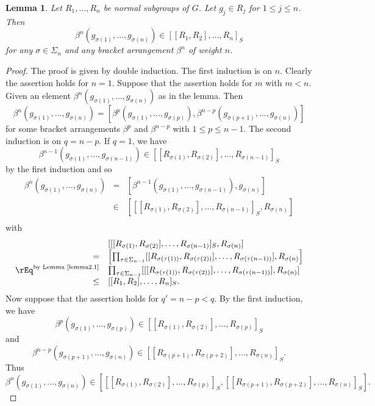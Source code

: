 \documentclass[10pt]{amsart}
\newtheorem{lem}[thm]{Lemma}
\numberwithin{equation}{section}
\begin{document}
\begin{lem}\label{lemma2.3}
Let $R_1,\ldots,R_n$ be normal subgroups of $G$. Let $g_j\in R_j$ for $1\leq j\leq n$. Then
$$
\beta^n(g_{\sigma(1)},\ldots,g_{\sigma(n)})\in [[R_1,R_2],\ldots,R_n]_S
$$
for any $\sigma\in \Sigma_n$ and any bracket arrangement $\beta^n$ of weight $n$.
\end{lem}
\begin{proof}
The proof is given by double induction. The first induction is on $n$. Clearly the assertion holds for $n=1$. Suppose that the assertion holds for $m$ with $m<n$. Given an element $\beta^n(g_{\sigma(1)},\ldots,g_{\sigma(n)})$ as in the lemma. Then
$$
\beta^n(g_{\sigma(1)},\ldots,g_{\sigma(n)})=[\beta^p(g_{\sigma(1)},\ldots,g_{\sigma(p)}),\beta^{n-p}(g_{\sigma(p+1)},\ldots,g_{\sigma(n)})]
$$
for some bracket arrangements $\beta^p$ and $\beta^{n-p}$ with $1\leq p\leq n-1$. The second induction is on $q=n-p$. If $q=1$, we have
$$
\beta^{n-1}(g_{\sigma(1)},\ldots,g_{\sigma(n-1)})\in [[R_{\sigma(1)},R_{\sigma(2)}],\ldots,R_{\sigma(n-1)}]_S
$$
by the first induction and so
$$
\begin{array}{rcl}
\beta^n(g_{\sigma(1)},\ldots,g_{\sigma(n)})&=&[\beta^{n-1}(g_{\sigma(1)},\ldots,g_{\sigma(n-1)}),g_{\sigma(n)}]\\
&\in& [[[R_{\sigma(1)},R_{\sigma(2)}],\ldots,R_{\sigma(n-1)}]_S, R_{\sigma(n)}]\\
\end{array}
$$
with
$$
\begin{array}{rl}
& [[[R_{\sigma(1)},R_{\sigma(2)}],\ldots,R_{\sigma(n-1)}]_S, R_{\sigma(n)}]\\
=&\left[\prod_{\tau\in\Sigma_{n-1}}[[R_{\sigma(\tau(1))},R_{\sigma(\tau(2))}],\ldots,R_{\sigma(\tau(n-1))}],R_{\sigma(n)}\right]\\
\rEq^{\textrm{by Lemma~\ref{lemma2.1}}}&\prod_{\tau\in\Sigma_{n-1}}[[[R_{\sigma(\tau(1))},R_{\sigma(\tau(2))}],\ldots,R_{\sigma(\tau(n-1))}], R_{\sigma(n)}]\\
\leq& [[R_1,R_2],\ldots,R_n]_S.\\
\end{array}
$$
Now suppose that the assertion holds for $q'=n-p<q$. By the first induction, we have
$$
\beta^p(g_{\sigma(1)},\ldots,g_{\sigma(p)})\in [[R_{\sigma(1)},R_{\sigma(2)}],\ldots,R_{\sigma(p)}]_S
$$
and
$$
\beta^{n-p}(g_{\sigma(p+1)},\ldots,g_{\sigma(n)})\in [[R_{\sigma(p+1)},R_{\sigma(p+2)}],\ldots,R_{\sigma(n)}]_S.
$$
Thus
$$
\beta^{n}(g_{\sigma(1)},\ldots,g_{\sigma(n)})\in \left[[[R_{\sigma(1)},R_{\sigma(2)}],\ldots,R_{\sigma(p)}]_S, [[R_{\sigma(p+1)},R_{\sigma(p+2)}],\ldots,R_{\sigma(n)}]_S\right].
$$
\end{proof}
\end{document}
